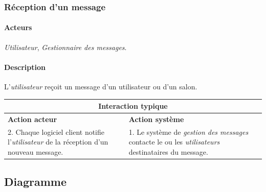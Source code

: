 \documentclass[a4paper]{article}
\begin{document}
   \subsubsection{Réception d'un message}
   \label{reception}

    \paragraph{Acteurs} \textit{Utilisateur},
    \textit{Gestionnaire des messages}.

    \paragraph{Description} L'\textit{utilisateur} reçoit un message d'un
    utilisateur ou d'un salon.

    \begin{center}
        \begin{tabular}{|p{6cm}|p{6cm}|}
            \hline
            \multicolumn{2}{|c|}{\textbf{Interaction typique}} \\ \hline
            \textbf{Action acteur} & \textbf{Action système} \\ \hline
            2. Chaque logiciel client notifie l'\textit{utilisateur} de la
            réception d'un nouveau message.
            & 1. Le système de \textit{gestion des messages} contacte le ou les
            \textit{utilisateurs} destinataires du message. \\
            \hline
        \end{tabular}
    \end{center}

 \subsection{Diagramme}

    \begin{figure}[p]
    \end{figure}
\end{document}
